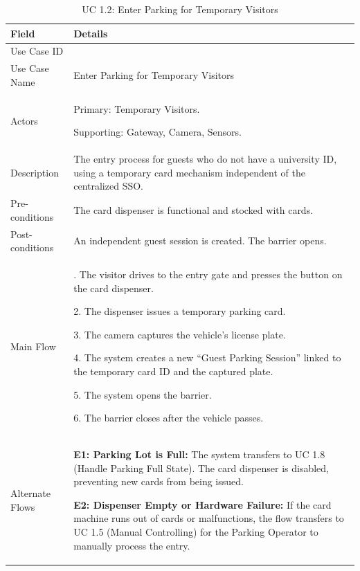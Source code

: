 \begin{table}[H]
\small
\renewcommand{\arraystretch}{1.4}
\begin{tabularx}{\textwidth}{|>{\raggedright\arraybackslash}p{3.5cm}|>{\RaggedRight\arraybackslash}X|}
\hline
\rowcolor{gray!20} \textbf{Field} & \textbf{Details} \\
\hline
Use Case ID & 1.2 \\
\hline
Use Case Name & Enter Parking for Temporary Visitors \\
\hline
Actors & Primary: Temporary Visitors.\par Supporting: Gateway, Camera, Sensors. \\
\hline
Description & The entry process for guests who do not have a university ID, using a temporary card mechanism independent of the centralized SSO. \\
\hline
Pre-conditions & The card dispenser is functional and stocked with cards. \\
\hline
Post-conditions & An independent guest session is created. The barrier opens. \\
\hline
Main Flow & 
1. The visitor drives to the entry gate and presses the button on the card dispenser. \par
2. The dispenser issues a temporary parking card. \par
3. The camera captures the vehicle's license plate. \par
4. The system creates a new ``Guest Parking Session'' linked to the temporary card ID and the captured plate. \par
5. The system opens the barrier. \par
6. The barrier closes after the vehicle passes. \\
\hline
Alternate Flows & 
\textbf{E1: Parking Lot is Full:} The system transfers to UC 1.8 (Handle Parking Full State). The card dispenser is disabled, preventing new cards from being issued. \par \vspace{0.5em}
\textbf{E2: Dispenser Empty or Hardware Failure:} If the card machine runs out of cards or malfunctions, the flow transfers to UC 1.5 (Manual Controlling) for the Parking Operator to manually process the entry. \\
\hline
\end{tabularx}
\caption{UC 1.2: Enter Parking for Temporary Visitors}
\label{tab:uc1.2}
\end{table}